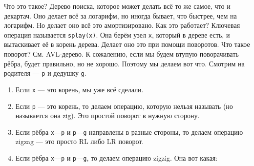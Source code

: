 \documentclass{article}
\newcommand{\pseudo}{PseudoLexer.py:PseudoLexer -x}
\newcommand{\pseudocode}[1]{\texttt{#1}}
\begin{document}
    Что это такое? Дерево поиска, которое может делать всё то же самое, что и декартач. Оно делает всё за логарифм, но иногда бывает, что быстрее, чем на логарифм. Но делает оно всё это амортизировано. Как это работает? Ключевая операция называется \pseudocode{splay(x)}. Она берём узел \pseudocode{x}, который в дереве есть, и вытаскивает её в корень дерева. Делает оно это при помощи поворотов. Что такое поворот? См. AVL-дерево. К сожалению, если мы будем втупую поворачивать рёбра, будет правильно, но не хорошо. Поэтому мы делаем вот что. Смотрим на родителя --- \pseudocode{p} и дедушку \pseudocode{g}.
    \begin{enumerate}
        \addtocounter{enumi}{-1}
        \item Если \pseudocode{x} --- это корень, мы уже всё сделали.
        \item Если \pseudocode{p} --- это корень, то делаем операцию, которую нельзя называть (но называется она zig). Это простой поворот в нужную сторону.
        \item Если рёбра \pseudocode{x}---\pseudocode{p} и \pseudocode{p}---\pseudocode{g} направлены в разные стороны, то делаем операцию zigzag --- это просто RL либо LR поворот.
        \item Если рёбра \pseudocode{x}---\pseudocode{p} и \pseudocode{p}---\pseudocode{g}, то делаем операцию zigzig. Она вот какая:
        \begin{center}

\end{center}
\end{enumerate}
\end{document}
